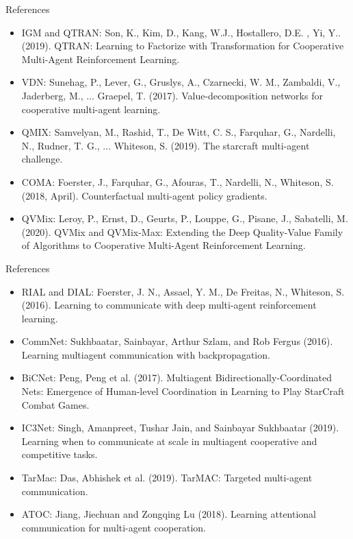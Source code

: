 \documentclass{beamer}
\begin{document}
\begin{frame}{References}
\begin{itemize}
    \item  IGM and QTRAN: Son, K., Kim, D., Kang, W.J., Hostallero, D.E. , Yi, Y.. (2019). QTRAN: Learning to Factorize with Transformation for Cooperative Multi-Agent Reinforcement Learning.
    \item VDN: Sunehag, P., Lever, G., Gruslys, A., Czarnecki, W. M., Zambaldi, V., Jaderberg, M., ...  Graepel, T. (2017). Value-decomposition networks for cooperative multi-agent learning.
    \item QMIX: Samvelyan, M., Rashid, T., De Witt, C. S., Farquhar, G., Nardelli, N., Rudner, T. G., ...  Whiteson, S. (2019). The starcraft multi-agent challenge.
    \item COMA: Foerster, J., Farquhar, G., Afouras, T., Nardelli, N.,  Whiteson, S. (2018, April). Counterfactual multi-agent policy gradients. 
    \item QVMix: Leroy, P., Ernst, D., Geurts, P., Louppe, G., Pisane, J.,  Sabatelli, M. (2020). QVMix and QVMix-Max: Extending the Deep Quality-Value Family of Algorithms to Cooperative Multi-Agent Reinforcement Learning. 
\end{itemize}
\end{frame}
\begin{frame}{References}
    \begin{itemize}
    \item RIAL and DIAL: Foerster, J. N., Assael, Y. M., De Freitas, N., Whiteson, S. (2016). Learning to communicate with deep multi-agent reinforcement learning.
    
    \item CommNet: Sukhbaatar, Sainbayar, Arthur Szlam, and Rob Fergus (2016). Learning multiagent communication with backpropagation.
    \item BiCNet: Peng, Peng et al. (2017). Multiagent Bidirectionally-Coordinated Nets: Emergence of Human-level Coordination in Learning to Play StarCraft Combat Games.
    \item IC3Net: Singh, Amanpreet, Tushar Jain, and Sainbayar Sukhbaatar (2019). Learning when to communicate at scale in multiagent cooperative and competitive tasks.
    \item TarMac: Das, Abhishek et al. (2019). TarMAC: Targeted multi-agent communication.
    \item ATOC: Jiang, Jiechuan and Zongqing Lu (2018). Learning attentional communication for multi-agent cooperation.
    \end{itemize}
\end{frame}
\end{document}
